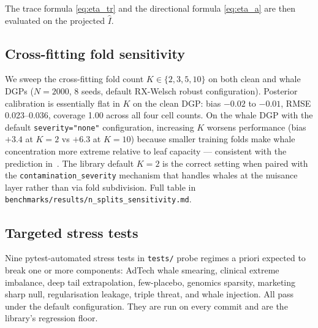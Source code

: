 The trace formula \eqref{eq:eta_tr}
and the directional formula \eqref{eq:eta_a} are then evaluated
on the projected $\widehat I$.

\subsection{Cross-fitting fold sensitivity}
\label{app:nsplits}
We sweep the cross-fitting fold count $K \in \{2, 3, 5, 10\}$ on
both clean and whale DGPs ($N = 2000$, 8 seeds, default RX-Welsch
robust configuration). Posterior calibration is essentially flat
in $K$ on the clean DGP: bias $-0.02$ to $-0.01$, RMSE 0.023--0.036,
coverage 1.00 across all four cell counts. On the whale DGP with
the default \texttt{severity="none"} configuration, increasing $K$
worsens performance (bias $+3.4$ at $K=2$ vs $+6.3$ at $K=10$)
because smaller training folds make whale concentration more
extreme relative to leaf capacity --- consistent with the prediction
in~\citet{kennedy2020optimal}. The library default $K = 2$ is the
correct setting when paired with the
\texttt{contamination\_severity} mechanism that handles whales at
the nuisance layer rather than via fold subdivision. Full table in
\texttt{benchmarks/results/n\_splits\_sensitivity.md}.

\subsection{Targeted stress tests}
\label{app:stress}
Nine pytest-automated stress tests in \texttt{tests/} probe regimes
a priori expected to break one or more components:
AdTech whale smearing, clinical extreme imbalance, deep tail
extrapolation, few-placebo, genomics sparsity, marketing sharp
null, regularisation leakage, triple threat, and whale injection.
All pass under the default configuration. They are run on every
commit and are the library's regression floor.
